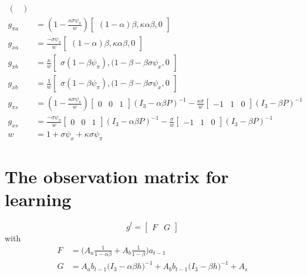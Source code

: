 \documentclass[11pt]{article}
\renewcommand{\[}{\begin{equation}}
\renewcommand{\]}{\end{equation}}
\begin{document}
\begin{align}
\begin{pmatrix}
\end{pmatrix} \\
g_{\pi a} & =(1-\frac{\kappa\sigma\psi_{\pi}}{w} )  \begin{bmatrix}(1-\alpha)\beta, \kappa\alpha\beta, 0 \end{bmatrix} \\
g_{x a} & =  \frac{-\sigma\psi_{\pi}}{w} \begin{bmatrix}(1-\alpha)\beta, \kappa\alpha\beta, 0 \end{bmatrix}\\
g_{\pi b} & = \frac{\kappa}{w} \begin{bmatrix}\sigma(1-\beta\psi_{\pi}), (1-\beta-\beta\sigma\psi_x, 0 \end{bmatrix}\\
g_{x b} & = \frac{1}{w} \begin{bmatrix}\sigma(1-\beta\psi_{\pi}), (1-\beta-\beta\sigma\psi_x, 0 \end{bmatrix} \\
g_{\pi s} & = (1-\frac{\kappa\sigma\psi_{\pi}}{w} )\begin{bmatrix} 0&0&1 \end{bmatrix} (I_3 - \alpha\beta P)^{-1} -\frac{\kappa\sigma}{w}\begin{bmatrix} -1&1&0 \end{bmatrix} (I_3 -\beta P)^{-1}\\
g_{x s} & =  \frac{-\sigma\psi_{\pi}}{w} \begin{bmatrix} 0&0&1 \end{bmatrix}(I_3 - \alpha\beta P)^{-1}  -\frac{\sigma}{w}\begin{bmatrix} -1&1&0 \end{bmatrix}(I_3 -\beta P)^{-1}\\
w & = 1+\sigma\psi_x +\kappa\sigma\psi_{\pi}
\end{align}

\section{The observation matrix for learning}\label{app_FG}
\begin{equation}
g^l = \begin{bmatrix} F & G \end{bmatrix}
\end{equation}
with
\begin{align}
F & = \bigg(A_a \frac{1}{1-\alpha\beta} + A_b\frac{1}{1-\beta} \bigg)a_{t-1}\\
G & = A_a b_{t-1}\bigg(I_3 - \alpha\beta h \bigg)^{-1} + A_b b_{t-1}\bigg(I_3 - \beta h \bigg)^{-1} + A_s
\end{align}
\end{document}
